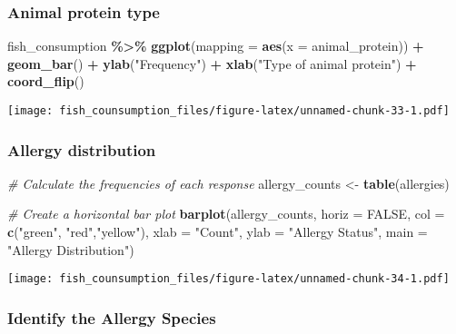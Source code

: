 \documentclass[
]{article}
\newenvironment{Shaded}{\begin{snugshade}}{\end{snugshade}}
\newcommand{\AttributeTok}[1]{\textcolor[rgb]{0.13,0.29,0.53}{#1}}
\newcommand{\CommentTok}[1]{\textcolor[rgb]{0.56,0.35,0.01}{\textit{#1}}}
\newcommand{\ConstantTok}[1]{\textcolor[rgb]{0.56,0.35,0.01}{#1}}
\newcommand{\FunctionTok}[1]{\textcolor[rgb]{0.13,0.29,0.53}{\textbf{#1}}}
\newcommand{\NormalTok}[1]{#1}
\newcommand{\OtherTok}[1]{\textcolor[rgb]{0.56,0.35,0.01}{#1}}
\newcommand{\SpecialCharTok}[1]{\textcolor[rgb]{0.81,0.36,0.00}{\textbf{#1}}}
\newcommand{\StringTok}[1]{\textcolor[rgb]{0.31,0.60,0.02}{#1}}
\begin{document}
\hypertarget{animal-protein-type}{%
\subsubsection{Animal protein type}\label{animal-protein-type}}

\begin{Shaded}
\begin{Highlighting}[]
\NormalTok{fish\_consumption }\SpecialCharTok{\%\textgreater{}\%}
\FunctionTok{ggplot}\NormalTok{(}\AttributeTok{mapping =} \FunctionTok{aes}\NormalTok{(}\AttributeTok{x =}\NormalTok{ animal\_protein)) }\SpecialCharTok{+}
\FunctionTok{geom\_bar}\NormalTok{() }\SpecialCharTok{+}
\FunctionTok{ylab}\NormalTok{(}\StringTok{"Frequency"}\NormalTok{) }\SpecialCharTok{+}
\FunctionTok{xlab}\NormalTok{(}\StringTok{"Type of animal protein"}\NormalTok{) }\SpecialCharTok{+}
\FunctionTok{coord\_flip}\NormalTok{()}
\end{Highlighting}
\end{Shaded}

\texttt{[image: fish\_counsumption\_files/figure-latex/unnamed-chunk-33-1.pdf]}

\hypertarget{allergy-distribution}{%
\subsubsection{Allergy distribution}\label{allergy-distribution}}

\begin{Shaded}
\begin{Highlighting}[]
\CommentTok{\# Calculate the frequencies of each response}
\NormalTok{allergy\_counts }\OtherTok{\textless{}{-}} \FunctionTok{table}\NormalTok{(allergies)}

\CommentTok{\# Create a horizontal bar plot}
\FunctionTok{barplot}\NormalTok{(allergy\_counts, }\AttributeTok{horiz =} \ConstantTok{FALSE}\NormalTok{, }\AttributeTok{col =} \FunctionTok{c}\NormalTok{(}\StringTok{"green"}\NormalTok{, }\StringTok{"red"}\NormalTok{,}\StringTok{"yellow"}\NormalTok{),}
        \AttributeTok{xlab =} \StringTok{"Count"}\NormalTok{, }\AttributeTok{ylab =} \StringTok{"Allergy Status"}\NormalTok{, }\AttributeTok{main =} \StringTok{"Allergy Distribution"}\NormalTok{)}
\end{Highlighting}
\end{Shaded}

\texttt{[image: fish\_counsumption\_files/figure-latex/unnamed-chunk-34-1.pdf]}

\hypertarget{identify-the-allergy-species}{%
\subsubsection{Identify the Allergy
Species}\label{identify-the-allergy-species}}
\end{document}
